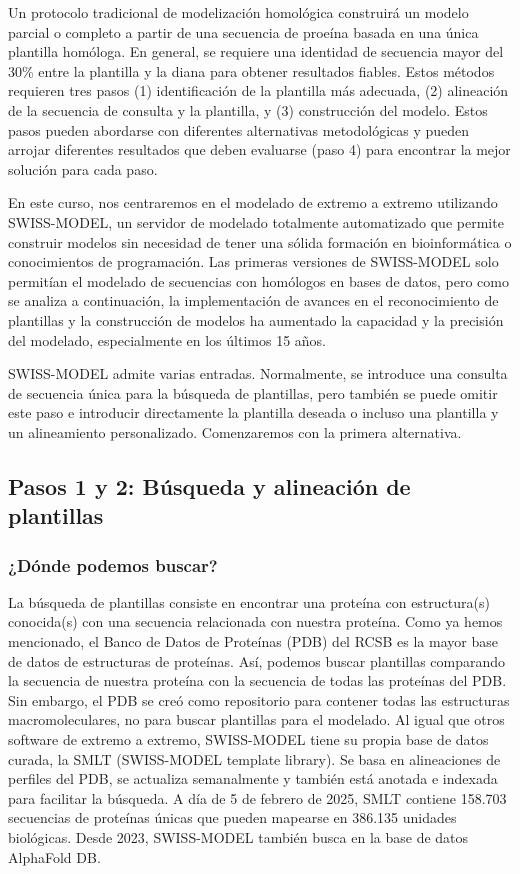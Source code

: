 Un protocolo tradicional de modelización homológica construirá un modelo parcial o completo a partir de una secuencia de proeína basada en una única plantilla homóloga. En general, se requiere una identidad de secuencia mayor del 30\% entre la plantilla y la diana para obtener resultados fiables. Estos métodos requieren tres pasos (1) identificación de la plantilla más adecuada, (2) alineación de la secuencia de consulta y la plantilla, y (3) construcción del modelo. Estos pasos pueden abordarse con diferentes alternativas metodológicas y pueden arrojar diferentes resultados que deben evaluarse (paso 4) para encontrar la mejor solución para cada paso. 

En este curso, nos centraremos en el modelado de extremo a extremo utilizando SWISS-MODEL, un servidor de modelado totalmente automatizado que permite construir modelos sin necesidad de tener una sólida formación en bioinformática o conocimientos de programación. Las primeras versiones de SWISS-MODEL solo permitían el modelado de secuencias con homólogos en bases de datos, pero como se analiza a continuación, la implementación de avances en el reconocimiento de plantillas y la construcción de modelos ha aumentado la capacidad y la precisión del modelado, especialmente en los últimos 15 años.

SWISS-MODEL admite varias entradas. Normalmente, se introduce una consulta de secuencia única para la búsqueda de plantillas, pero también se puede omitir este paso e introducir directamente la plantilla deseada o incluso una plantilla y un alineamiento personalizado. Comenzaremos con la primera alternativa.

\subsection{Pasos 1 y 2: Búsqueda y alineación de plantillas}
\subsubsection{¿Dónde podemos buscar?}
La búsqueda de plantillas consiste en encontrar una proteína con estructura(s) conocida(s) con una secuencia relacionada con nuestra proteína. Como ya hemos mencionado, el Banco de Datos de Proteínas (PDB) del RCSB es la mayor base de datos de estructuras de proteínas. Así, podemos buscar plantillas comparando la secuencia de nuestra proteína con la secuencia de todas las proteínas del PDB. Sin embargo, el PDB se creó como repositorio para contener todas las estructuras macromoleculares, no para buscar plantillas para el modelado. Al igual que otros software de extremo a extremo, SWISS-MODEL tiene su propia base de datos curada, la SMLT (SWISS-MODEL template library). Se basa en alineaciones de perfiles del PDB, se actualiza semanalmente y también está anotada e indexada para facilitar la búsqueda. A día de 5 de febrero de 2025, SMLT contiene 158.703 secuencias de proteínas únicas que pueden mapearse en 386.135 unidades biológicas. Desde 2023, SWISS-MODEL también busca en la base de datos AlphaFold DB.

